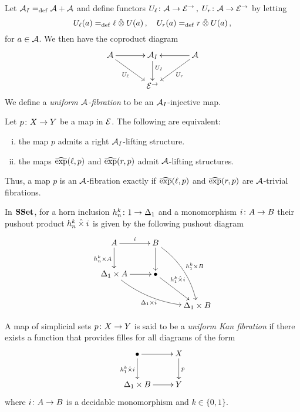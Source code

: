\documentclass[reqno,10pt,a4paper,oneside]{amsart}
\begin{document}
\medskip

Let $\cal{A}_\interval \defeq \cal{A} + \cal{A}$ and define functors $U_\intervall \co \cal{A} \to \catE^\to \, , \; U_\intervalr \co \cal{A} \to \catE^\to$  by letting 
\[
U_\intervall(a) \defeq  \intervall \hatotimes U(a) \, , \quad
U_\intervalr(a) \defeq  \intervalr \hatotimes U(a) \, , 
\]
for $a \in \cal{A}$. We then have the coproduct diagram
\[
\xymatrix@C=1.2cm{
\cal{A} \ar[r] \ar[dr]_-{U_\intervall} & \cal{A}_\interval \ar[d]^(.4){U_\interval} & \cal{A} \ar[dl]^-{U_\intervalr} \ar[l] \\ 
 & \catE^\to }
\]
We define a \emph{uniform $\cal{A}$-fibration} to be an $\cal{A}_\interval$-injective map.


\begin{corollary} Let $p \co X \to Y$ be a map in $\cal{E}$. The following are equivalent: 
\begin{enumerate}[(i)]
\item the map $p$ admits a right $\cal{A}_I$-lifting structure. 
\item the maps $\hatexp(\intervall, p)$ and $\hatexp(\intervalr, p)$ admit $\cal{A}$-lifting structures.
\end{enumerate} 
Thus, a map $p$ is an $\cal{A}$-fibration exactly if $\hatexp(\intervall, p)$ and $\hatexp(\intervalr, p)$ are $\cal{A}$-trivial fibrations.
\end{corollary}


 In $\SSet$, for a horn inclusion $h^{k}_n \co 1 \to \Delta_1$ and  a monomorphism $i \co A \to B$
their pushout product $h^k_n \hattimes i$ is given by the following pushout diagram
\[
\xymatrix{
 A \ar[r]^{i}  \ar[d]_{h^k_n \times A} &  B \ar@/^1em/[ddr]^{h^k_1 \times B} \ar[d] & \\ 
\Delta_1 \times A \ar@/_1em/[drr]_{\Delta_1 \times i} \ar[r] & \bullet \ar[dr]^-(.35){h^k_1 \hattimes i}  & \\ 
 & & \Delta_1 \times B} 
 \]
 
 

\begin{definition} A map of simplicial sets $p \co X \to Y$ is said to be a \emph{uniform Kan fibration} if there exists
a function that provides filles for all diagrams of the form
\[
\xymatrix{
\bullet \ar[r] \ar[d]_{h^k_1 \hattimes i} & X \ar[d]^p \\
\Delta_1 \times B \ar[r] & Y}
\]
where $i \co A \to B$ is a decidable monomorphism and $k \in \{0, 1\}$. 

\end{definition} 
\end{document}
